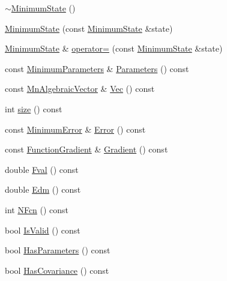 \begin{DoxyCompactItemize}
\item 
\mbox{\hyperlink{classROOT_1_1Minuit2_1_1MinimumState_a30666c7113d7e8c199d4de1b1a44ee03}{$\sim$\+Minimum\+State}} ()
\item 
\mbox{\hyperlink{classROOT_1_1Minuit2_1_1MinimumState_a7e5a25f631c74fffd8cfd14d2268600e}{Minimum\+State}} (const \mbox{\hyperlink{classROOT_1_1Minuit2_1_1MinimumState}{Minimum\+State}} \&state)
\item 
\mbox{\hyperlink{classROOT_1_1Minuit2_1_1MinimumState}{Minimum\+State}} \& \mbox{\hyperlink{classROOT_1_1Minuit2_1_1MinimumState_ad0d12f94b8f1adca2b2c4279006f82e4}{operator=}} (const \mbox{\hyperlink{classROOT_1_1Minuit2_1_1MinimumState}{Minimum\+State}} \&state)
\item 
const \mbox{\hyperlink{classROOT_1_1Minuit2_1_1MinimumParameters}{Minimum\+Parameters}} \& \mbox{\hyperlink{classROOT_1_1Minuit2_1_1MinimumState_aa81bb59c8eb8c262ef2487ca1b025481}{Parameters}} () const
\item 
const \mbox{\hyperlink{namespaceROOT_1_1Minuit2_a62ed97730a1ca8d3fbaec64a19aa11c9}{Mn\+Algebraic\+Vector}} \& \mbox{\hyperlink{classROOT_1_1Minuit2_1_1MinimumState_a0c7ad9c9226473f87b1bbb15ed87bbcd}{Vec}} () const
\item 
int \mbox{\hyperlink{classROOT_1_1Minuit2_1_1MinimumState_af680928a4485a4d0db0c81a8283d24bd}{size}} () const
\item 
const \mbox{\hyperlink{classROOT_1_1Minuit2_1_1MinimumError}{Minimum\+Error}} \& \mbox{\hyperlink{classROOT_1_1Minuit2_1_1MinimumState_a28d9bb6148e54a7bf4ca15ca9548fe23}{Error}} () const
\item 
const \mbox{\hyperlink{classROOT_1_1Minuit2_1_1FunctionGradient}{Function\+Gradient}} \& \mbox{\hyperlink{classROOT_1_1Minuit2_1_1MinimumState_a08a0d667e1f89522a29c49c9c02e642d}{Gradient}} () const
\item 
double \mbox{\hyperlink{classROOT_1_1Minuit2_1_1MinimumState_aad936fc04cd24c5b769748b93ded0ab9}{Fval}} () const
\item 
double \mbox{\hyperlink{classROOT_1_1Minuit2_1_1MinimumState_a397315b170efca9446f7d6a91bae6c59}{Edm}} () const
\item 
int \mbox{\hyperlink{classROOT_1_1Minuit2_1_1MinimumState_aedc2a07bcaf49ef63ac092a867463731}{N\+Fcn}} () const
\item 
bool \mbox{\hyperlink{classROOT_1_1Minuit2_1_1MinimumState_ae8bab1ba76b2d6597c79224e966da5f5}{Is\+Valid}} () const
\item 
bool \mbox{\hyperlink{classROOT_1_1Minuit2_1_1MinimumState_a5871d5838abf68982d9e2ed7a66ea5c3}{Has\+Parameters}} () const
\item 
bool \mbox{\hyperlink{classROOT_1_1Minuit2_1_1MinimumState_aba1e55d52217a591657dba0cc9fa8c9c}{Has\+Covariance}} () const
\end{DoxyCompactItemize}


